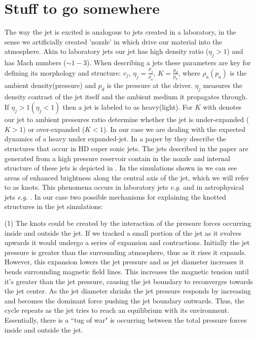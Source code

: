 \section{Stuff to go somewhere}
The way the jet is excited is analogous to jets created in a laboratory, in the sense we artificially created 'nozzle' in which drive our material into the atmosphere. Akin to laboratory jets our jet has high density ratio ($\eta_j >1$) and has Mach numbers ($\sim 1-3$). When describing a jets these parameters are key for defining its morphology and structure: $v_j$, $\eta_j = \frac{\rho_j}{\rho_a}$, $K = \frac{p_{d}}{p_a}$, where $\rho_a(p_a)$ is the ambient density(pressure) and $p_{d}$ is the pressure at the driver. $\eta_j$ measures the density contrast of the jet itself and the ambient medium it propagates through. If $\eta_j>1(\eta_j<1)$ then a jet is labeled to as heavy(light). For $K$ with denotes our jet to ambient pressures ratio determine whether the jet is under-expanded ($K>1$) or over-expanded ($K<1$). In our case we are dealing with the expected dynamics of a heavy under expanded-jet. In a paper by \cite{Norman1982} they describe the structures that occur in HD super sonic jets. The jets described in the paper are generated from a high pressure reservoir contain in the nozzle and internal structure of these jets is depicted in . In the simulations shown in  we can see areas of enhanced brightness along the central axis of the jet, which we will refer to as knots. This phenomena occurs in laboratory jets \textit{e.g.} \citep{Ono2014,Edgington-Mitchell2014,Menon2010} and in astrophysical jets \textit{e.g.} \cite{Blandford2019,Belan2011,DeGouveiaDalPino2005,Birkinshaw1996}. In our case two possible mechanisms for explaining the knotted structures in the jet simulations: \\
\par (1) The knots could be created by the interaction of the pressure forces occurring inside and outside the jet. If we tracked a small portion of the jet as it evolves upwards it would undergo a series of expansion and contractions. Initially the jet pressure is greater than the surrounding atmosphere, thus as it rises it expands. However, this expansion lowers the jet pressure and as jet diameter increases it bends surrounding magnetic field lines. This increases the magnetic tension until it's greater than the jet pressure, causing the jet boundary to reconverges towards the jet center. As the jet diameter shrinks the jet pressure responds by increasing and becomes the dominant force pushing the jet boundary outwards. Thus, the cycle repeats as the jet tries to reach an equilibrium with its environment. Essentially, there is a ``tug of war" is occurring between the total pressure forces inside and outside the jet.  \\
